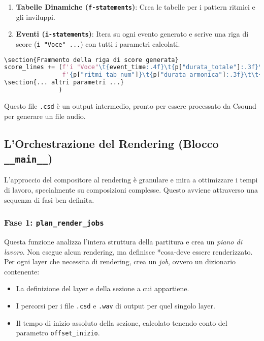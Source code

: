 \begin{enumerate}
    \item \textbf{Tabelle Dinamiche (\texttt{f{-}statements})}: Crea le tabelle per i pattern ritmici e gli inviluppi.
    \item \textbf{Eventi (\texttt{i{-}statements})}: Itera su ogni evento generato e scrive una riga di score (\texttt{i "Voce" ...}) con tutti i parametri calcolati.
\end{enumerate}
\begin{lstlisting}[language=Python]
\section{Frammento della riga di score generata}
score_lines += (f'i "Voce"\t{event_time:.4f}\t{p["durata_totale"]:.3f}\t'
                f'{p["ritmi_tab_num"]}\t{p["durata_armonica"]:.3f}\t\t{p["dynamic_index"]:.6f}\t'
\section{... altri parametri ...}
               )
\end{lstlisting}
Questo file \texttt{.csd} è un output intermedio, pronto per essere processato da Csound per generare un file audio.
\subsection{L'Orchestrazione del Rendering (Blocco \texttt{\_\_main\_\_})}
L'approccio del compositore al rendering è granulare e mira a ottimizzare i tempi di lavoro, specialmente su composizioni complesse. Questo avviene attraverso una sequenza di fasi ben definita.
\subsubsection{Fase 1: \texttt{plan\_render\_jobs}}
Questa funzione analizza l'intera struttura della partitura e crea un \textit{piano di lavoro}. Non esegue alcun rendering, ma definisce *cosa-deve essere renderizzato. Per ogni layer che necessita di rendering, crea un \textit{job}, ovvero un dizionario contenente:
\begin{itemize}
 \item La definizione del layer e della sezione a cui appartiene.
 \item I percorsi per i file \texttt{.csd} e \texttt{.wav} di output per quel singolo layer.
 \item Il tempo di inizio assoluto della sezione, calcolato tenendo conto del parametro \texttt{offset\_inizio}.
\end{itemize}

